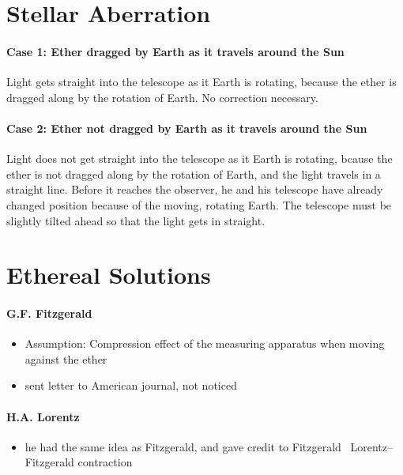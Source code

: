 \documentclass[pagesize,headsepline,10pt,parskip=half]{scrreprt}
\begin{document}
    \section{Stellar Aberration}
      \paragraph{Case 1: Ether dragged by Earth as it travels around the Sun}
        Light gets straight into the telescope as it Earth is rotating,
        because the ether is dragged along by the rotation of Earth.
        No correction necessary.

      \paragraph{Case 2: Ether not dragged by Earth as it travels around the Sun}
        Light does not get straight into the telescope as it Earth is rotating,
        bcause the ether is not dragged along by the rotation of Earth, and
        the light travels in a straight line.  Before it reaches the observer,
        he and his telescope have already changed position because
        of the moving, rotating Earth.  The telescope must be slightly tilted
        ahead so that the light gets in straight.

    \section{Ethereal Solutions}
      \paragraph{G.F. Fitzgerald}
        \begin{itemize}
          \item Assumption: Compression effect of the measuring apparatus when moving against the ether
          \item sent letter to American journal, not noticed
        \end{itemize}

      \paragraph{H.A. Lorentz}
        \begin{itemize}
          \item he had the same idea as Fitzgerald, and gave credit to Fitzgerald
          \rightarrow~Lorentz–Fitzgerald contraction
        \end{itemize}
\end{document}
